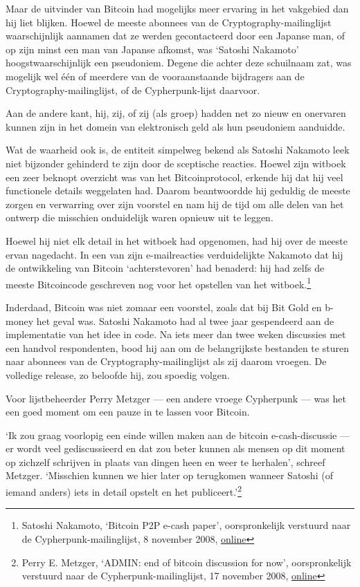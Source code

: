 \documentclass[smalldemyvopaper,11pt,twoside,onecolumn,openright,extrafontsizes,hidelinks]{memoir}
\begin{document}
Maar de uitvinder van Bitcoin had mogelijks meer ervaring in het
vakgebied dan hij liet blijken. Hoewel de meeste abonnees van de
Cryptography-mailinglijst waarschijnlijk aannamen dat ze werden
gecontacteerd door een Japanse man, of op zijn minst een man van Japanse
afkomst, was `Satoshi Nakamoto' hoogstwaarschijnlijk een pseudoniem.
Degene die achter deze schuilnaam zat, was mogelijk wel één of meerdere
van de vooraanstaande bijdragers aan de Cryptography-mailinglijst, of de
Cypherpunk-lijst daarvoor.

Aan de andere kant, hij, zij, of zij (als groep) hadden net zo nieuw en
onervaren kunnen zijn in het domein van elektronisch geld als hun
pseudoniem aanduidde.

Wat de waarheid ook is, de entiteit simpelweg bekend als Satoshi
Nakamoto leek niet bijzonder gehinderd te zijn door de sceptische
reacties. Hoewel zijn witboek een zeer beknopt overzicht was van het
Bitcoinprotocol, erkende hij dat hij veel functionele details weggelaten
had. Daarom beantwoordde hij geduldig de meeste zorgen en verwarring
over zijn voorstel en nam hij de tijd om alle delen van het ontwerp die
misschien onduidelijk waren opnieuw uit te leggen.

Hoewel hij niet elk detail in het witboek had opgenomen, had hij over de
meeste ervan nagedacht. In een van zijn e-mailreacties verduidelijkte
Nakamoto dat hij de ontwikkeling van Bitcoin `achterstevoren' had
benaderd: hij had zelfs de meeste Bitcoincode geschreven nog voor het
opstellen van het witboek.\footnote{Satoshi Nakamoto, `Bitcoin P2P
  e-cash paper', oorspronkelijk verstuurd naar de
  Cypherpunk-mailinglijst, 8 november 2008,
  \href{https://www.metzdowd.com/pipermail/cryptography/2008-November/014832.html}{online}}

Inderdaad, Bitcoin was niet zomaar een voorstel, zoals dat bij Bit Gold
en b-money het geval was. Satoshi Nakamoto had al twee jaar gespendeerd
aan de implementatie van het idee in code. Na iets meer dan twee weken
discussies met een handvol respondenten, bood hij aan om de
belangrijkste bestanden te sturen naar abonnees van de
Cryptography-mailinglijst als zij daarom vroegen. De volledige release,
zo beloofde hij, zou spoedig volgen.

Voor lijstbeheerder Perry Metzger --- een andere vroege Cypherpunk ---
was het een goed moment om een pauze in te lassen voor Bitcoin.

`Ik zou graag voorlopig een einde willen maken aan de bitcoin
e-cash-discussie --- er wordt veel gediscussieerd en dat zou beter
kunnen als mensen op dit moment op zichzelf schrijven in plaats van
dingen heen en weer te herhalen', schreef Metzger. `Misschien kunnen we
hier later op terugkomen wanneer Satoshi (of iemand anders) iets in
detail opstelt en het publiceert.'\footnote{Perry E. Metzger, `ADMIN:
  end of bitcoin discussion for now', oorspronkelijk verstuurd naar de
  Cypherpunk-mailinglijst, 17 november 2008,
  \href{https://www.metzdowd.com/pipermail/cryptography/2008-November/014867.html}{online}}
\end{document}
